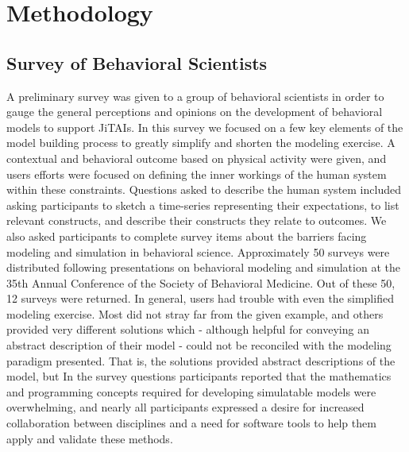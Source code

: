 \documentclass{sigchi}
\begin{document}

\section{Methodology}
\subsection{Survey of Behavioral Scientists}
A preliminary survey was given to a group of behavioral scientists in order to gauge the general perceptions and opinions on the development of behavioral models to support JiTAIs.
In this survey we focused on a few key elements of the model building process to greatly simplify and shorten the modeling exercise.
A contextual and behavioral outcome based on physical activity were given, and users efforts were focused on defining the inner workings of the human system within these constraints.
Questions asked to describe the human system included asking participants to sketch a time-series representing their expectations, to list relevant constructs, and describe their constructs they relate to outcomes.
We also asked participants to complete survey items about the barriers facing modeling and simulation in behavioral science.
Approximately 50 surveys were distributed following presentations on behavioral modeling and simulation at the 35th Annual Conference of the Society of Behavioral Medicine. 
Out of these 50, 12 surveys were returned.
In general, users had trouble with even the simplified modeling exercise.
Most did not stray far from the given example, and others provided very different solutions which - although helpful for conveying an abstract description of their model - could not be reconciled with the modeling paradigm presented.
That is, the solutions provided abstract descriptions of the model, but 
In the survey questions participants reported that the mathematics and programming concepts required for developing simulatable models were overwhelming, and nearly all participants expressed a desire for increased collaboration between disciplines and a need for software tools to help them apply and validate these methods.
\end{document}

